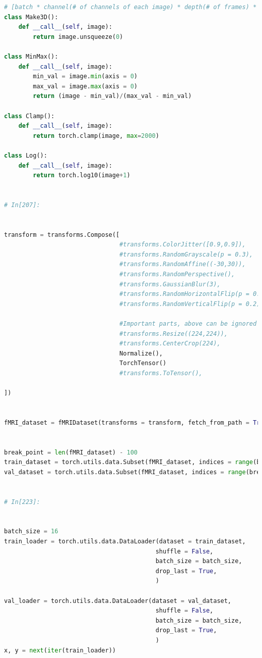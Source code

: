 \documentclass[10pt, twocolumn, letterpaper]{article}
\begin{document}
\begin{lstlisting}[language=Python]
# [batch * channel(# of channels of each image) * depth(# of frames) * height * width]
class Make3D():
    def __call__(self, image):        
        return image.unsqueeze(0)
    
class MinMax(): 
    def __call__(self, image):
        min_val = image.min(axis = 0)
        max_val = image.max(axis = 0)
        return (image - min_val)/(max_val - min_val)
    
class Clamp():
    def __call__(self, image):
        return torch.clamp(image, max=2000)

class Log():
    def __call__(self, image):
        return torch.log10(image+1)


# In[207]:


transform = transforms.Compose([
                                #transforms.ColorJitter([0.9,0.9]),
                                #transforms.RandomGrayscale(p = 0.3),
                                #transforms.RandomAffine((-30,30)),
                                #transforms.RandomPerspective(),
                                #transforms.GaussianBlur(3),
                                #transforms.RandomHorizontalFlip(p = 0.2),
                                #transforms.RandomVerticalFlip(p = 0.2),

                                #Important parts, above can be ignored
                                #transforms.Resize((224,224)),
                                #transforms.CenterCrop(224),
                                Normalize(),
                                TorchTensor()    
                                #transforms.ToTensor(),
                                                                
])


fMRI_dataset = fMRIDataset(transforms = transform, fetch_from_path = True)


break_point = len(fMRI_dataset) - 100 
train_dataset = torch.utils.data.Subset(fMRI_dataset, indices = range(break_point))
val_dataset = torch.utils.data.Subset(fMRI_dataset, indices = range(break_point, len(fMRI_dataset)))


# In[223]:


batch_size = 16
train_loader = torch.utils.data.DataLoader(dataset = train_dataset,
                                          shuffle = False,
                                          batch_size = batch_size,
                                          drop_last = True,
                                          )

val_loader = torch.utils.data.DataLoader(dataset = val_dataset,
                                          shuffle = False,
                                          batch_size = batch_size,
                                          drop_last = True,
                                          )
x, y = next(iter(train_loader))


\end{lstlisting}
\end{document}
